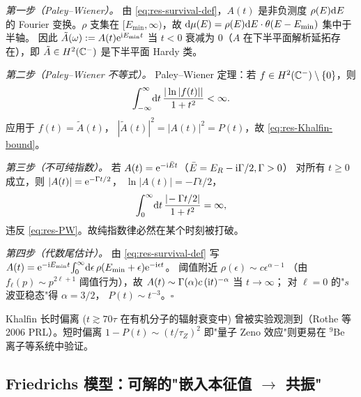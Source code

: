 \begin{proof*}
  \emph{第一步（Paley--Wiener）。}
  由 \eqref{eq:res-survival-def}，$A(t)$ 是非负测度 $\rho(E)\mathrm{d} E$
  的 Fourier 变换。$\rho$ 支集在 $[E_{\min},\infty)$，故
  $\mathrm{d}\mu(E)=\rho(E)\mathrm{d} E\cdot\theta(E-E_{\min})$ 集中于半轴。
  因此 $\tilde A(\omega):=A(t)\mathrm{e}^{\mathrm{i} E_{\min}t}$
  当 $t<0$ 衰减为 $0$（$A$ 在下半平面解析延拓存在），即
  $\tilde A\in H^2(\mathbb{C}^-)$ 是下半平面 Hardy 类。

  \emph{第二步（Paley--Wiener 不等式）。}
  Paley--Wiener 定理：若 $f\in H^2(\mathbb{C}^-)\setminus\{0\}$，则
  \begin{equation}\label{eq:res-PW}
    \int_{-\infty}^{\infty}\!\mathrm{d} t\,\frac{|\ln |f(t)||}{1+t^2}<\infty.
  \end{equation}
  应用于 $f(t)=\tilde A(t)$，
  $|\tilde A(t)|^2=|A(t)|^2=P(t)$，故 \eqref{eq:res-Khalfin-bound}。

  \emph{第三步（不可纯指数）。}
  若 $A(t)=\mathrm{e}^{-\mathrm{i}\bar E t}$（$\bar E=E_R-\mathrm{i}\Gamma/2,\Gamma>0$）
  对所有 $t\geq 0$ 成立，则 $|A(t)|=\mathrm{e}^{-\Gamma t/2}$，
  $\ln|A(t)|=-\Gamma t/2$，
  \begin{equation*}
    \int_0^\infty\!\mathrm{d} t\,\frac{|\!-\Gamma t/2|}{1+t^2}=\infty,
  \end{equation*}
  违反 \eqref{eq:res-PW}。故纯指数律必然在某个时刻被打破。

  \emph{第四步（代数尾估计）。}
  由 \eqref{eq:res-survival-def} 写
  $A(t)=\mathrm{e}^{-\mathrm{i} E_{\min}t}\!\int_0^\infty\!\mathrm{d}\epsilon\,\rho(E_{\min}+\epsilon)\mathrm{e}^{-\mathrm{i}\epsilon t}$。
  阈值附近 $\rho(\epsilon)\sim c\epsilon^{\alpha-1}$
  （由 $f_\ell(p)\sim p^{2\ell+1}$ 阈值行为），故
  $A(t)\sim \Gamma(\alpha)c\,(\mathrm{i} t)^{-\alpha}$ 当 $t\to\infty$；
  对 $\ell=0$ 的"$s$ 波亚稳态"得 $\alpha=3/2$，
  $P(t)\sim t^{-3}$。$\square$
\end{proof*}

\begin{remark}[实验验证]
  Khalfin 长时偏离 ($t\gtrsim 70\tau$ 在有机分子的辐射衰变中)
  曾被实验观测到（Rothe 等 2006 PRL）。短时偏离 $1-P(t)\sim (t/\tau_Z)^2$
  即"量子 Zeno 效应"则更易在 $^9$Be 离子等系统中验证。
\end{remark}

\subsection{Friedrichs 模型：可解的"嵌入本征值 $\to$ 共振"}\label{subsec:res-Friedrichs}

